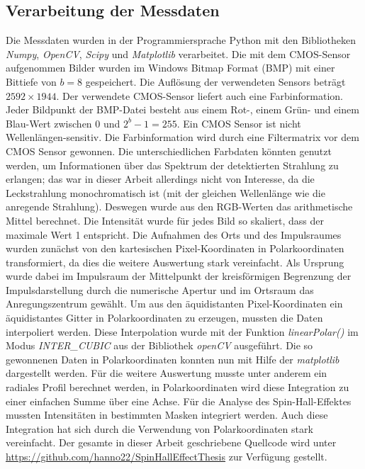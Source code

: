 \documentclass[titlepage,  ngerman]{article}
\begin{document}
	\subsection{Verarbeitung der Messdaten}
	\label{sec:polar_calculation}
	Die Messdaten wurden in der Programmiersprache Python mit den Bibliotheken \textit{Numpy}, \textit{OpenCV}, \textit{Scipy} und \textit{Matplotlib} verarbeitet. Die mit dem CMOS-Sensor aufgenommen Bilder wurden im Windows Bitmap Format (BMP) mit einer Bittiefe von  $b = 8$ gespeichert. Die Auflösung der verwendeten Sensors beträgt $2592 \times 1944$. Der verwendete CMOS-Sensor liefert auch eine Farbinformation. Jeder Bildpunkt der BMP-Datei besteht aus einem Rot-, einem Grün- und einem Blau-Wert zwischen $0$ und $2^b - 1= 255$. Ein CMOS Sensor ist nicht Wellenlängen-sensitiv. Die Farbinformation wird durch eine Filtermatrix vor dem CMOS Sensor gewonnen. Die unterschiedlichen Farbdaten könnten genutzt werden, um Informationen über das Spektrum der detektierten Strahlung zu erlangen; das war in dieser Arbeit allerdings nicht von Interesse, da die Leckstrahlung monochromatisch ist (mit der gleichen Wellenlänge wie die anregende Strahlung). Deswegen wurde aus den RGB-Werten das arithmetische Mittel berechnet. Die Intensität wurde für jedes Bild so skaliert, dass der maximale Wert 1 entspricht. Die Aufnahmen des Orts und des Impulsraumes wurden zunächst von den kartesischen Pixel-Koordinaten in Polarkoordinaten transformiert, da dies die weitere Auswertung stark vereinfacht. Als Ursprung wurde dabei im Impulsraum der Mittelpunkt der kreisförmigen Begrenzung der Impulsdarstellung durch die numerische Apertur und im Ortsraum das Anregungszentrum gewählt. Um aus den äquidistanten Pixel-Koordinaten ein äquidistantes Gitter in Polarkoordinaten zu erzeugen, mussten die Daten interpoliert werden. Diese Interpolation wurde mit der Funktion \textit{linearPolar()} im Modus \textit{INTER\_CUBIC} aus der Bibliothek \textit{openCV} ausgeführt. Die so gewonnenen Daten in Polarkoordinaten konnten nun mit Hilfe der \textit{matplotlib} dargestellt werden. Für die weitere Auswertung musste unter anderem ein radiales Profil berechnet werden, in Polarkoordinaten wird diese Integration zu einer einfachen Summe über eine Achse. Für die Analyse des Spin-Hall-Effektes mussten Intensitäten in bestimmten Masken integriert werden. Auch diese Integration hat sich durch die Verwendung von Polarkoordinaten stark vereinfacht. Der gesamte in dieser Arbeit geschriebene Quellcode wird unter \url{https://github.com/hanno22/SpinHallEffectThesis} zur Verfügung gestellt.
	\newpage
	
\end{document}
